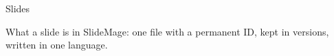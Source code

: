 
\begin{sectionframe}{Slides}
	\begin{minipage}[t]{0.9\linewidth}\small
		What a slide is in SlideMage: one file with a permanent ID, kept in versions, written in one language.
	\end{minipage}\par\medskip
	\SMChapterAgenda
\end{sectionframe}
